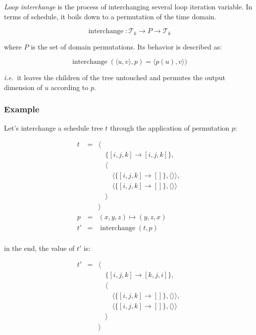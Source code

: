 \documentclass{article}
\DeclareMathOperator\interchange{interchange}
\begin{document}
\emph{Loop interchange} is the process of interchanging several loop iteration
variable. In terms of schedule, it boils down to a permutation of the time
domain.

\[
    \interchange: \mathcal{T}_k \rightarrow P \rightarrow \mathcal{T}_k
\]

\noindent where $P$ is the set of domain permutations. Its behavior is described as:

\[
    \interchange(\langle u, v\rangle, p) = \langle p(u), v\rangle)
\]

\noindent \emph{i.e.}\ it leaves the children of the tree untouched and
permutes the output dimension of $u$ according to $p$.

\subsubsection*{Example}

Let's interchange a schedule tree $t$ through the application of permutation $p$:

\[
    \begin{array}{lcl}
        t &=& \langle \\
          & & \quad\{[i,j,k] \rightarrow [i,j,k] \},\\
          & & \quad\langle \\
          & & \quad\quad \langle\{ [i,j,k] \rightarrow [] \}, \langle\rangle\rangle,\\
          & & \quad\quad \langle\{ [i,j,k] \rightarrow [] \}, \langle\rangle\rangle\\
          & & \quad\rangle \\
          & & \rangle \\
        p &=& (x, y, z) \mapsto (y, z, x) \\
        t'&=& \interchange(t, p) \\
    \end{array}
\]

\noindent in the end, the value of $t'$ is:

\[
    \begin{array}{lcl}
        t'&=& \langle \\
          & & \quad\{[i,j,k] \rightarrow [k,j,i] \},\\
          & & \quad\langle \\
          & & \quad\quad \langle\{ [i,j,k] \rightarrow [] \}, \langle\rangle\rangle,\\
          & & \quad\quad \langle\{ [i,j,k] \rightarrow [] \}, \langle\rangle\rangle\\
          & & \quad\rangle \\
          & & \rangle \\
    \end{array}
\]
\end{document}
